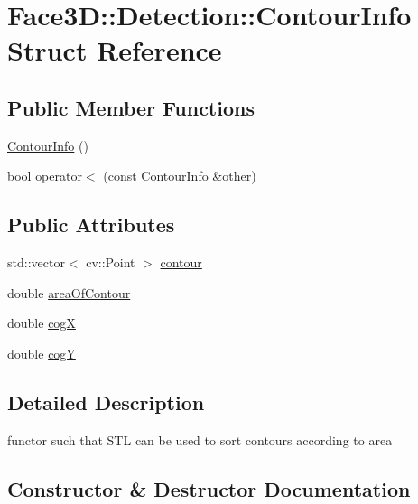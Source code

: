 \hypertarget{struct_face3_d_1_1_detection_1_1_contour_info}{}\section{Face3D\+:\+:Detection\+:\+:Contour\+Info Struct Reference}
\label{struct_face3_d_1_1_detection_1_1_contour_info}
\subsection*{Public Member Functions}
\begin{DoxyCompactItemize}
\item 
\hyperlink{struct_face3_d_1_1_detection_1_1_contour_info_a93e812ae1bdc43e561accee3040185ef}{Contour\+Info} ()
\item 
bool \hyperlink{struct_face3_d_1_1_detection_1_1_contour_info_a36d082505c98919d94ffb041016c436e}{operator$<$} (const \hyperlink{struct_face3_d_1_1_detection_1_1_contour_info}{Contour\+Info} \&other)
\end{DoxyCompactItemize}
\subsection*{Public Attributes}
\begin{DoxyCompactItemize}
\item 
std\+::vector$<$ cv\+::\+Point $>$ \hyperlink{struct_face3_d_1_1_detection_1_1_contour_info_a758e6ad092c81d6c8b9e25bc35f07e53}{contour}
\item 
double \hyperlink{struct_face3_d_1_1_detection_1_1_contour_info_a2622475368ea0295120fde0d57daca5f}{area\+Of\+Contour}
\item 
double \hyperlink{struct_face3_d_1_1_detection_1_1_contour_info_ab3b12cdb015852630da5d8dce2f293ee}{cogX}
\item 
double \hyperlink{struct_face3_d_1_1_detection_1_1_contour_info_ad7c5269ab9a7fa7b968d6d4d6311ede0}{cogY}
\end{DoxyCompactItemize}


\subsection{Detailed Description}
functor such that S\+TL can be used to sort contours according to area 

\subsection{Constructor \& Destructor Documentation}
